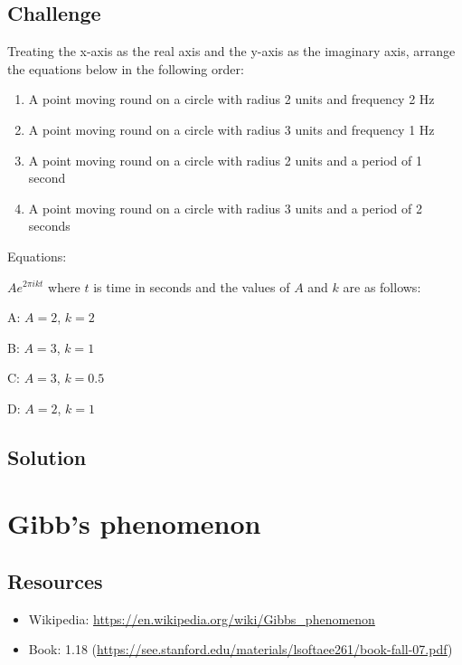 \subsection*{Challenge}
Treating the x-axis as the real axis and the y-axis as the imaginary axis, arrange the equations below in the following order:

\begin{enumerate}
    \item A point moving round on a circle with radius 2 units and frequency 2 Hz
    \item A point moving round on a circle with radius 3 units and frequency 1 Hz
    \item A point moving round on a circle with radius 2 units and a period of 1 second
    \item A point moving round on a circle with radius 3 units and a period of 2 seconds
\end{enumerate}

Equations:

$\displaystyle A e^{2 \pi i k t}$ where $t$ is time in seconds and the values of $A$ and $k$ are as follows:

A: $A=2$, $k=2$ 

B: $A=3$, $k=1$

C: $A=3$, $k=0.5$

D: $A=2$, $k=1$

\subsection*{Solution}
\six{}


\timebox




\newpage
\section{Gibb's phenomenon}

\subsection*{Resources}
\begin{itemize}
    \item Wikipedia: \url{https://en.wikipedia.org/wiki/Gibbs_phenomenon}
    \item Book: 1.18 (\url{https://see.stanford.edu/materials/lsoftaee261/book-fall-07.pdf})
\end{itemize}

